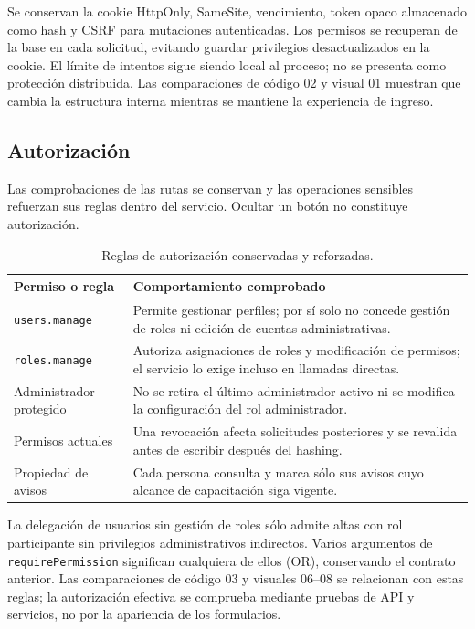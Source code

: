 Se conservan la cookie HttpOnly, SameSite, vencimiento, token opaco almacenado como
hash y CSRF para mutaciones autenticadas. Los permisos se recuperan de la base en
cada solicitud, evitando guardar privilegios desactualizados en la cookie. El
límite de intentos sigue siendo local al proceso; no se presenta como protección
distribuida. Las comparaciones de código 02 y visual 01 muestran que cambia la
estructura interna mientras se mantiene la experiencia de ingreso.

\subsection{Autorización}
Las comprobaciones de las rutas se conservan y las operaciones sensibles refuerzan
sus reglas dentro del servicio. Ocultar un botón no constituye autorización.

\begin{table}[htbp]\centering\small
\begin{tabular}{P{0.32\textwidth}P{0.60\textwidth}}
\toprule Permiso o regla & Comportamiento comprobado \\ \midrule
\texttt{users.manage} & Permite gestionar perfiles; por sí solo no concede gestión de roles ni edición de cuentas administrativas. \\
\texttt{roles.manage} & Autoriza asignaciones de roles y modificación de permisos; el servicio lo exige incluso en llamadas directas. \\
Administrador protegido & No se retira el último administrador activo ni se modifica la configuración del rol administrador. \\
Permisos actuales & Una revocación afecta solicitudes posteriores y se revalida antes de escribir después del hashing. \\
Propiedad de avisos & Cada persona consulta y marca sólo sus avisos cuyo alcance de capacitación siga vigente. \\
\bottomrule
\end{tabular}
\caption{Reglas de autorización conservadas y reforzadas.}
\end{table}

La delegación de usuarios sin gestión de roles sólo admite altas con rol
participante sin privilegios administrativos indirectos. Varios argumentos de
\texttt{requirePermission} significan cualquiera de ellos (OR), conservando el
contrato anterior. Las comparaciones de código 03 y visuales 06--08 se relacionan
con estas reglas; la autorización efectiva se comprueba mediante pruebas de API
y servicios, no por la apariencia de los formularios.

